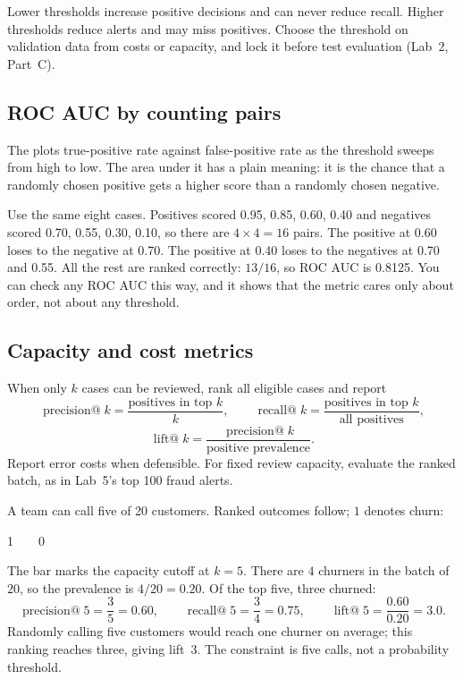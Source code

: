 \begin{keyidea}
Lower thresholds increase positive decisions and can never reduce recall. Higher thresholds reduce alerts and may miss positives. Choose the threshold on validation data from costs or capacity, and lock it before test evaluation (Lab~2, Part~C).
\end{keyidea}

\subsection{ROC AUC by counting pairs}

The  plots true-positive rate against false-positive rate as the threshold sweeps from high to low. The area under it has a plain meaning: it is the chance that a randomly chosen positive gets a higher score than a randomly chosen negative.

\begin{workedexample}
Use the same eight cases. Positives scored 0.95, 0.85, 0.60, 0.40 and negatives scored 0.70, 0.55, 0.30, 0.10, so there are $4\times4=16$ pairs. The positive at 0.60 loses to the negative at 0.70. The positive at 0.40 loses to the negatives at 0.70 and 0.55. All the rest are ranked correctly: $13/16$, so ROC AUC is 0.8125. You can check any ROC AUC this way, and it shows that the metric cares only about order, not about any threshold.
\end{workedexample}

\subsection{Capacity and cost metrics}
\label{sec:capacity-metrics}

When only $k$ cases can be reviewed, rank all eligible cases and report
\[
\operatorname{precision@}k=\frac{\text{positives in top }k}{k},
\qquad
\operatorname{recall@}k=\frac{\text{positives in top }k}{\text{all positives}},
\]
\[
\operatorname{lift@}k=
\frac{\operatorname{precision@}k}{\text{positive prevalence}}.
\]
Report error costs when defensible. For fixed review capacity, evaluate the ranked batch, as in Lab~5's top 100 fraud alerts.

\begin{workedexample}
A team can call five of 20 customers. Ranked outcomes follow; $1$ denotes churn:
\begin{center}\ttfamily\small
1\ \ \vrule\ \ 0
\end{center}
The bar marks the capacity cutoff at $k=5$. There are $4$ churners in the batch of $20$, so the prevalence is $4/20=0.20$. Of the top five, three churned:
\[
  \operatorname{precision@}5=\frac{3}{5}=0.60,
  \qquad
  \operatorname{recall@}5=\frac{3}{4}=0.75,
  \qquad
  \operatorname{lift@}5=\frac{0.60}{0.20}=3.0.
\]
Randomly calling five customers would reach one churner on average; this ranking reaches three, giving lift~3. The constraint is five calls, not a probability threshold.
\end{workedexample}

